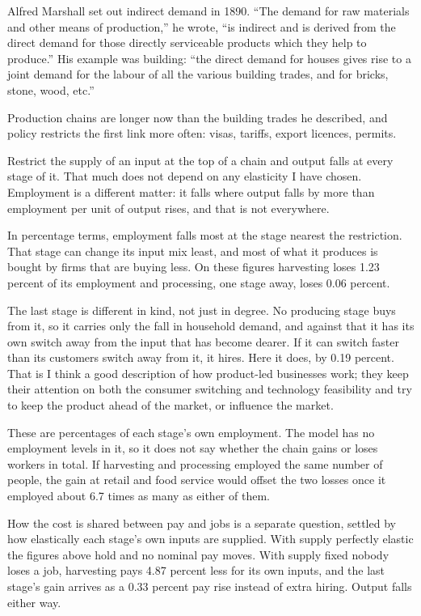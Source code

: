 \documentclass[11pt,a4paper]{article}
\begin{document}
Alfred Marshall set out indirect demand in 1890. ``The demand for raw materials and other means of production,'' he wrote, ``is indirect and is derived from the direct demand for those directly serviceable products which they help to produce.'' His example was building: ``the direct demand for houses gives rise to a joint demand for the labour of all the various building trades, and for bricks, stone, wood, etc.''

Production chains are longer now than the building trades he described, and policy restricts the first link more often: visas, tariffs, export licences, permits.

Restrict the supply of an input at the top of a chain and output falls at every stage of it. That much does not depend on any elasticity I have chosen. Employment is a different matter: it falls where output falls by more than employment per unit of output rises, and that is not everywhere.

In percentage terms, employment falls most at the stage nearest the restriction. That stage can change its input mix least, and most of what it produces is bought by firms that are buying less. On these figures harvesting loses 1.23 percent of its employment and processing, one stage away, loses 0.06 percent.

The last stage is different in kind, not just in degree. No producing stage buys from it, so it carries only the fall in household demand, and against that it has its own switch away from the input that has become dearer. If it can switch faster than its customers switch away from it, it hires. Here it does, by 0.19 percent. That is I think a good description of how product-led businesses work; they keep their attention on both the consumer switching and technology feasibility and try to keep the product ahead of the market, or influence the market.

These are percentages of each stage's own employment. The model has no employment levels in it, so it does not say whether the chain gains or loses workers in total. If harvesting and processing employed the same number of people, the gain at retail and food service would offset the two losses once it employed about 6.7 times as many as either of them.

How the cost is shared between pay and jobs is a separate question, settled by how elastically each stage's own inputs are supplied. With supply perfectly elastic the figures above hold and no nominal pay moves. With supply fixed nobody loses a job, harvesting pays 4.87 percent less for its own inputs, and the last stage's gain arrives as a 0.33 percent pay rise instead of extra hiring. Output falls either way.
\end{document}
